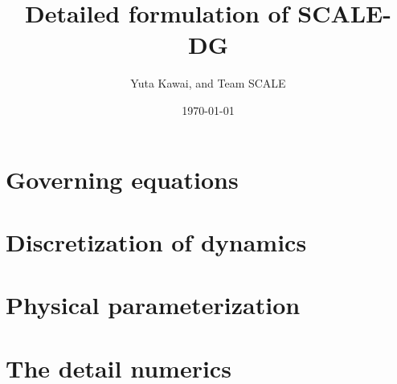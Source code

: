 \documentclass[a4paper,12pt]{report}
\title{{\LARGE Detailed formulation of SCALE-DG}}
\author{Yuta Kawai, and Team SCALE}
\date{\today}
\begin{document}
\maketitle
\tableofcontents



\chapter{Governing equations}


\chapter{Discretization of dynamics}
\label{chap:discretization dynamics}

\newpage

\newpage



\chapter{Physical parameterization}



\appendix
\chapter{The detail numerics}




\end{document}
